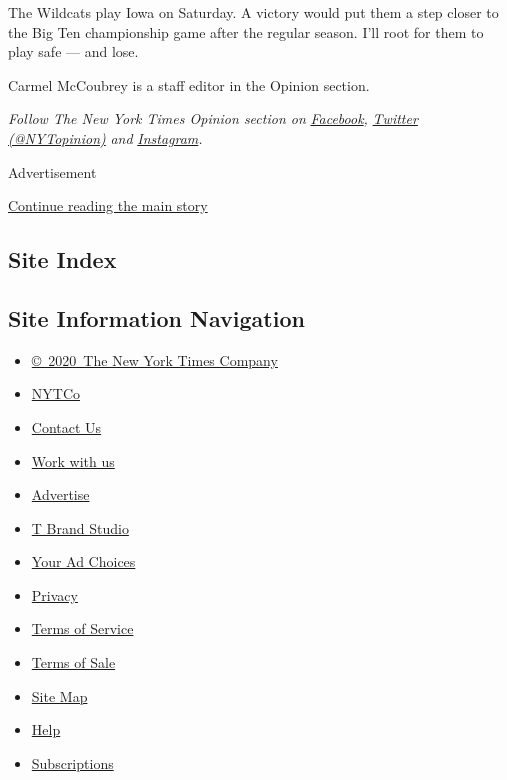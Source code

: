 The Wildcats play Iowa on Saturday. A victory would put them a step
closer to the Big Ten championship game after the regular season. I'll
root for them to play safe --- and lose.

Carmel McCoubrey is a staff editor in the Opinion section.

\emph{Follow The New York Times Opinion section on}
\href{https://www.facebookcorewwwi.onion/nytopinion}{\emph{Facebook}}\emph{,}
\href{http://twitter.com/NYTOpinion}{\emph{Twitter (@NYTopinion)}}
\emph{and}
\href{https://www.instagram.com/nytopinion/}{\emph{Instagram}}\emph{.}

Advertisement

\protect\hyperlink{after-bottom}{Continue reading the main story}

\hypertarget{site-index}{%
\subsection{Site Index}\label{site-index}}

\hypertarget{site-information-navigation}{%
\subsection{Site Information
Navigation}\label{site-information-navigation}}

\begin{itemize}
\tightlist
\item
  \href{https://help.nytimes3xbfgragh.onion/hc/en-us/articles/115014792127-Copyright-notice}{©~2020~The
  New York Times Company}
\end{itemize}

\begin{itemize}
\tightlist
\item
  \href{https://www.nytco.com/}{NYTCo}
\item
  \href{https://help.nytimes3xbfgragh.onion/hc/en-us/articles/115015385887-Contact-Us}{Contact
  Us}
\item
  \href{https://www.nytco.com/careers/}{Work with us}
\item
  \href{https://nytmediakit.com/}{Advertise}
\item
  \href{http://www.tbrandstudio.com/}{T Brand Studio}
\item
  \href{https://www.nytimes3xbfgragh.onion/privacy/cookie-policy\#how-do-i-manage-trackers}{Your
  Ad Choices}
\item
  \href{https://www.nytimes3xbfgragh.onion/privacy}{Privacy}
\item
  \href{https://help.nytimes3xbfgragh.onion/hc/en-us/articles/115014893428-Terms-of-service}{Terms
  of Service}
\item
  \href{https://help.nytimes3xbfgragh.onion/hc/en-us/articles/115014893968-Terms-of-sale}{Terms
  of Sale}
\item
  \href{https://spiderbites.nytimes3xbfgragh.onion}{Site Map}
\item
  \href{https://help.nytimes3xbfgragh.onion/hc/en-us}{Help}
\item
  \href{https://www.nytimes3xbfgragh.onion/subscription?campaignId=37WXW}{Subscriptions}
\end{itemize}
